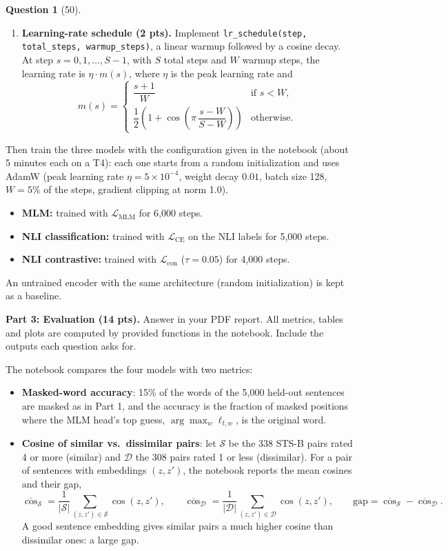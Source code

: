 \documentclass[12pt]{article}
\theoremstyle{definition}
\newtheorem{exercise}{Question}%
\begin{document}
\begin{exercise}[50]
\begin{enumerate}
  \item \textbf{Learning-rate schedule (2 pts).} Implement \texttt{lr\_schedule(step, total\_steps, warmup\_steps)},
  a linear warmup followed by a cosine decay. At step $s = 0, 1, \dots, S - 1$, with $S$ total steps and $W$ warmup
  steps, the learning rate is $\eta \cdot m(s)$, where $\eta$ is the peak learning rate and
  \[
    m(s) = \begin{cases}
      \dfrac{s + 1}{W} & \text{if } s < W, \\[2ex]
      \dfrac{1}{2}\left(1 + \cos\!\left(\pi\, \dfrac{s - W}{S - W}\right)\right) & \text{otherwise.}
    \end{cases}
  \]
\end{enumerate}

Then train the three models with the configuration given in the notebook (about 5 minutes each on a T4): each one
starts from a random initialization and uses AdamW (peak learning rate $\eta = 5 \times 10^{-4}$, weight decay $0.01$,
batch size 128, $W = 5\%$ of the steps, gradient clipping at norm 1.0).
\begin{itemize}
  \item \textbf{MLM:} trained with $\mathcal{L}_{\text{MLM}}$ for 6{,}000 steps.
  \item \textbf{NLI classification:} trained with $\mathcal{L}_{\text{CE}}$ on the NLI labels for 5{,}000 steps.
  \item \textbf{NLI contrastive:} trained with $\mathcal{L}_{\text{con}}$ ($\tau = 0.05$) for 4{,}000 steps.
\end{itemize}
An untrained encoder with the same architecture (random initialization) is kept as a baseline.

\textbf{Part 3: Evaluation (14 pts).} Answer in your PDF report. All metrics, tables and plots are computed by
provided functions in the notebook. Include the outputs each question asks for.

The notebook compares the four models with two metrics:
\begin{itemize}
  \item \textbf{Masked-word accuracy}: 15\% of the words of the 5{,}000 held-out sentences are
        masked as in Part 1, and the accuracy is the fraction of masked positions where the MLM head's top guess,
        $\arg\max_w \ell_{t,w}$, is the original word.
  \item \textbf{Cosine of similar vs.\ dissimilar pairs}: let $\mathcal{S}$ be the 338 STS-B
        pairs rated 4 or more (similar) and $\mathcal{D}$ the 308 pairs rated 1 or less (dissimilar). For a pair of
        sentences with embeddings $(z, z')$, the notebook reports the mean cosines and their gap,
        \[
          \overline{\cos}_{\mathcal{S}} = \frac{1}{|\mathcal{S}|} \sum_{(z, z') \in \mathcal{S}} \cos(z, z'), \qquad
          \overline{\cos}_{\mathcal{D}} = \frac{1}{|\mathcal{D}|} \sum_{(z, z') \in \mathcal{D}} \cos(z, z'), \qquad
          \text{gap} = \overline{\cos}_{\mathcal{S}} - \overline{\cos}_{\mathcal{D}}.
        \]
        A good sentence embedding gives similar pairs a much higher cosine than dissimilar ones: a large gap.
\end{itemize}


\end{exercise}
\end{document}
